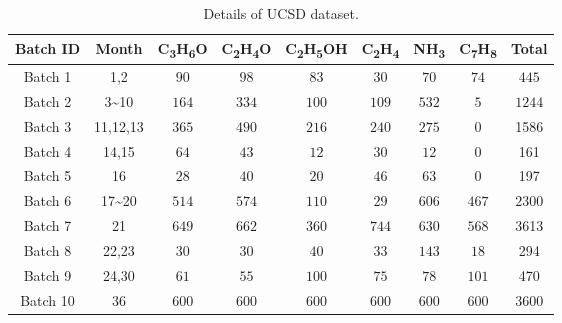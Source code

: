 \documentclass[a4paper]{cas-sc}
\begin{document}
\begin{table}[ht]
\centering
\setlength{\abovecaptionskip}{0pt}
\caption{Details of UCSD dataset.}
\setlength{\tabcolsep}{3.5mm}
\begin{tabular}{ccccccccc}
\toprule
Batch ID          & Month       & C\textsubscript{3}H\textsubscript{6}O &C\textsubscript{2}H\textsubscript{4}O & C\textsubscript{2}H\textsubscript{5}OH& C\textsubscript{2}H\textsubscript{4} & NH\textsubscript{3}  & C\textsubscript{7}H\textsubscript{8} & Total   \\
\midrule
Batch 1           & 1,2         & $90$    & $98$         & $83$    & $30$     & $70$    & $74$    & $445$   \\
Batch 2           & 3\textasciitilde10        & $164$   & $334$        & $100$   & $109$    & $532$   & $5$     & $1244$    \\
Batch 3           & 11,12,13    & $365$   & $490$        & $216$   & $240$    & $275$   & $0$     & 1586    \\
Batch 4           & 14,15       & $64$    & $43$         & $12$    & $30$     & $12$    & $0$     & 161     \\
Batch 5           & 16          & $28$    & $40$         & $20$    & $46$     & $63$    & $0$     & 197     \\
Batch 6           & 17\textasciitilde 20 & $514$   & $574$        & $110$   & $29$     & $606$   & $467$   & $2300$ \\
Batch 7           & 21          & $649$   & $662$        & $360$   & $744$    & $630$   & $568$   & 3613    \\
Batch 8           & 22,23       & $30$    & $30$         & $40$    & $33$     & $143$   & $18$    & 294     \\
Batch 9           & 24,30       & $61$    & $55$         & $100$   & $75$     & $78$    & $101$   & 470     \\
Batch 10          & 36          & $600$   & $600$        & $600$   & $600$    & $600$   & $600$   & $3600$  \\
\bottomrule     
\end{tabular}
\label{data A}
\end{table}
\end{document}
